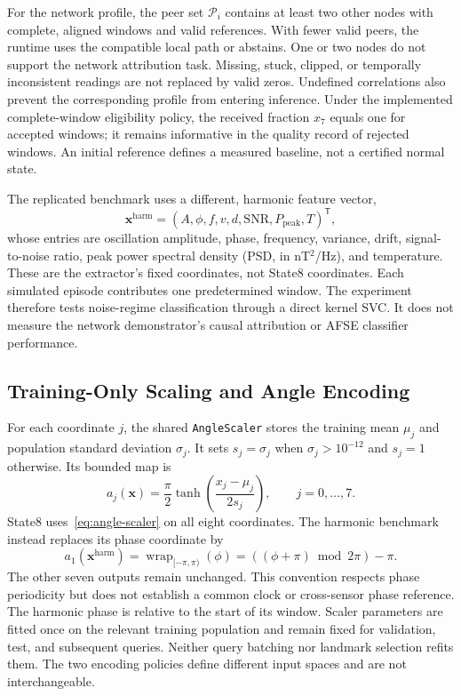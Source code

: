 

For the network profile, the peer set $\mathcal P_i$ contains at least two other nodes with complete, aligned windows and valid references. With fewer valid peers, the runtime uses the compatible local path or abstains. One or two nodes do not support the network attribution task. Missing, stuck, clipped, or temporally inconsistent readings are not replaced by valid zeros. Undefined correlations also prevent the corresponding profile from entering inference. Under the implemented complete-window eligibility policy, the received fraction $x_7$ equals one for accepted windows; it remains informative in the quality record of rejected windows. An initial reference defines a measured baseline, not a certified normal state.

The replicated benchmark uses a different, harmonic feature vector,
\begin{equation}
 \mathbf x^{\mathrm{harm}}=
 (A,\phi,f,v,d,\mathrm{SNR},P_{\mathrm{peak}},T)^{\mathsf T},
 \label{eq:harmonic-vector}
\end{equation}
whose entries are oscillation amplitude, phase, frequency, variance, drift, signal-to-noise ratio, peak power spectral density (PSD, in nT$^2$/Hz), and temperature. These are the extractor's fixed coordinates, not State8 coordinates. Each simulated episode contributes one predetermined window. The experiment therefore tests noise-regime classification through a direct kernel SVC. It does not measure the network demonstrator's causal attribution or AFSE classifier performance.

\subsection{Training-Only Scaling and Angle Encoding}
\label{sec:framework-encoding}

For each coordinate $j$, the shared \texttt{AngleScaler} stores the training mean $\mu_j$ and population standard deviation $\sigma_j$. It sets $s_j=\sigma_j$ when $\sigma_j>10^{-12}$ and $s_j=1$ otherwise. Its bounded map is
\begin{equation}
 a_j(\mathbf x)=\frac{\pi}{2}
    \tanh\!\left(\frac{x_j-\mu_j}{2s_j}\right),
 \qquad j=0,\ldots,7.
 \label{eq:angle-scaler}
\end{equation}
State8 uses~\eqref{eq:angle-scaler} on all eight coordinates. The harmonic benchmark instead replaces its phase coordinate by
\begin{equation}
 a_1(\mathbf x^{\mathrm{harm}})
   =\operatorname{wrap}_{[-\pi,\pi)}(\phi)
   =((\phi+\pi)\bmod 2\pi)-\pi.
 \label{eq:phase-direct}
\end{equation}
The other seven outputs remain unchanged. This convention respects phase periodicity but does not establish a common clock or cross-sensor phase reference. The harmonic phase is relative to the start of its window. Scaler parameters are fitted once on the relevant training population and remain fixed for validation, test, and subsequent queries. Neither query batching nor landmark selection refits them. The two encoding policies define different input spaces and are not interchangeable.

